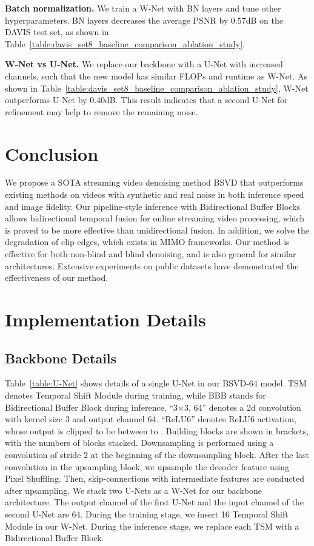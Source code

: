 \documentclass[sigconf]{acmart}
\begin{document}
\textbf{Batch normalization. }
We train a W-Net with BN layers and tune other hyperparameters. BN layers decreases the average PSNR by 0.57dB on the DAVIS test set, as shown in Table~\ref{table:davis_set8_baseline_comparison_ablation_study}.


\textbf{W-Net vs U-Net.}
We replace our backbone with a U-Net with increased channels, such that the new model has similar FLOPs and runtime as W-Net. As shown in Table~\ref{table:davis_set8_baseline_comparison_ablation_study}, W-Net outperforms U-Net by 0.40dB.
This result indicates that a second U-Net for refinement may help to remove the remaining noise.

\section{Conclusion}
We propose a SOTA streaming video denoising method BSVD that outperforms existing methods on videos with synthetic and real noise in both inference speed and image fidelity.
Our pipeline-style inference with Bidirectional Buffer Blocks allows bidirectional temporal fusion for online streaming video processing,
which is proved to be more effective than unidirectional fusion. In addition, we solve the degradation of clip edges, which exists in MIMO frameworks. Our method is effective for both non-blind and blind denoising, and is also general for similar architectures.
Extensive experiments on public datasets have demonstrated the effectiveness of our method.







\appendix
\newpage
\section{Implementation Details}

\subsection{Backbone Details}
Table~\ref{table:U-Net} shows details of a single U-Net in our BSVD-64 model.
TSM denotes Temporal Shift Module during training, while BBB stands for Bidirectional Buffer Block during inference.
“3×3, 64” denotes a 2d convolution with kernel size
3 and output channel 64. “ReLU6” denotes ReLU6 activation, whose output is clipped to be between  to .
Building blocks are shown in brackets, with the numbers of blocks stacked. Downsampling is performed using a convolution of stride 2 at the beginning of the downsampling block. 
After the last convolution in the upsampling block, we upsample the decoder feature using Pixel Shuffling. Then, skip-connections with intermediate features are conducted after upsampling. We stack two U-Nets as a W-Net for our backbone architecture. The output channel of the first U-Net and the input channel of the second U-Net are 64. During the training stage, we insert 16 Temporal Shift Module in our W-Net. During the inference stage, we replace each TSM with a Bidirectional Buffer Block.
\end{document}
